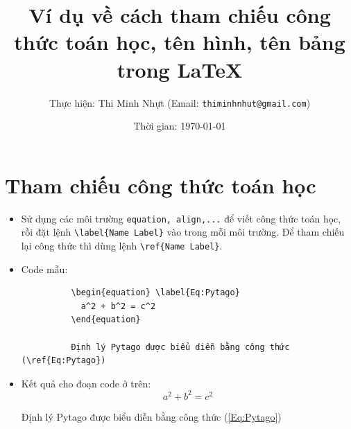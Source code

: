 \documentclass[12pt,a4paper]{article}
\title{Ví dụ về cách tham chiếu công thức toán học, tên hình, tên bảng trong \LaTeX}
\author{Thực hiện: Thi Minh Nhựt (Email: \texttt{thiminhnhut@gmail.com})}
\date{Thời gian: \today}
\begin{document}
  \maketitle

  \section{Tham chiếu công thức toán học}
    \begin{itemize}
      \item Sử dụng các môi trường \verb|equation, align,...| để viết công thức toán học, rồi đặt lệnh \verb|\label{Name Label}| vào trong mỗi môi trường. Để tham chiếu lại công thức thì dùng lệnh \verb|\ref{Name Label}|.
      \item Code mẫu:
        \begin{verbatim}
          \begin{equation} \label{Eq:Pytago}
            a^2 + b^2 = c^2
          \end{equation}
    
          Định lý Pytago được biểu diễn bằng công thức (\ref{Eq:Pytago})
        \end{verbatim}
      \item Kết quả cho đoạn code ở trên:
        \begin{equation} \label{Eq:Pytago}
          a^2 + b^2 = c^2
        \end{equation}

        Định lý Pytago được biểu diễn bằng công thức (\ref{Eq:Pytago})
    \end{itemize}
\end{document}
